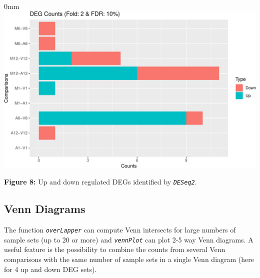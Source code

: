 \documentclass[14pt,]{article}
\newcommand{\hlnum}[1]{\textcolor[rgb]{0.816,0.125,0.439}{#1}}%
\newcommand{\hlstr}[1]{\textcolor[rgb]{0.251,0.627,0.251}{#1}}%
\newcommand{\hlstd}[1]{\textcolor[rgb]{0.251,0.251,0.251}{#1}}%
\newenvironment{Shaded}{\begin{myshaded}}{\end{myshaded}}
\newcommand{\DecValTok}[1]{\hlnum{#1}}
\newcommand{\SpecialCharTok}[1]{\hlstr{#1}}
\newcommand{\StringTok}[1]{\hlstr{#1}}
\newcommand{\OtherTok}[1]{{#1}}
\newcommand{\FunctionTok}[1]{\hlstd{#1}}
\newcommand{\AttributeTok}[1]{{#1}}
\newcommand{\NormalTok}[1]{\hlstd{#1}}
\begin{document}
\begin{adjustwidth}{\fltoffset}{0mm}
\includegraphics[width=1\linewidth,]{systemPipeR_files/figure-latex/deseq2_deg_counts-1} \end{adjustwidth}

\textbf{Figure 8:} Up and down regulated DEGs identified by \emph{\texttt{DESeq2}}.

\hypertarget{venn-diagrams}{%
\subsection{Venn Diagrams}\label{venn-diagrams}}

The function \emph{\texttt{overLapper}} can compute Venn intersects for large numbers of sample sets (up to 20 or more) and \emph{\texttt{vennPlot}} can plot 2-5 way Venn diagrams. A useful feature is the possibility to combine the counts from several Venn comparisons with the same number of sample sets in a single Venn diagram (here for 4 up and down DEG sets).

\begin{Shaded}
\end{Shaded}
\end{document}

